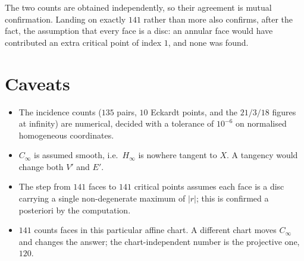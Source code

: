 \documentclass[11pt]{article}
\newcommand{\Cinf}{C_\infty}
\newcommand{\Hinf}{H_\infty}
\begin{document}
The two counts are obtained independently, so their agreement is mutual
confirmation. Landing on exactly $141$ rather than more also confirms, after the
fact, the assumption that every face is a disc: an annular face would have
contributed an extra critical point of index $1$, and none was found.

\section{Caveats}

\begin{itemize}\itemsep2pt
\item The incidence counts ($135$ pairs, $10$ Eckardt points, and the $21/3/18$
  figures at infinity) are numerical, decided with a tolerance of $10^{-6}$ on
  normalised homogeneous coordinates.
\item $\Cinf$ is assumed smooth, i.e.\ $\Hinf$ is nowhere tangent to $X$. A
  tangency would change both $V'$ and $E'$.
\item The step from $141$ faces to $141$ critical points assumes each face is a
  disc carrying a single non-degenerate maximum of $|r|$; this is confirmed a
  posteriori by the computation.
\item $141$ counts faces in this particular affine chart. A different chart moves
  $\Cinf$ and changes the answer; the chart-independent number is the projective
  one, $120$.
\end{itemize}
\end{document}
